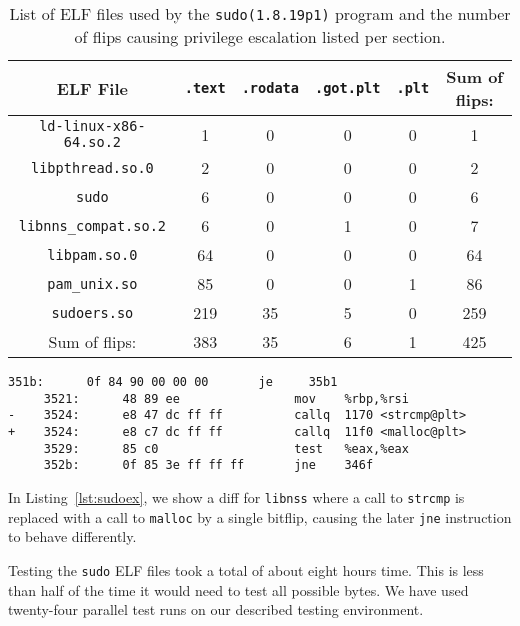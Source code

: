 \begin{table}[!htb]
\centering
\begin{tabular}{c|cccc|c}
ELF File & \texttt{.text}  & \texttt{.rodata} & \texttt{.got.plt} &
\texttt{.plt} & Sum of flips:                             \\ \hline
\texttt{ld-linux-x86-64.so.2} & 1   & 0  & 0  & 0  & 1    \\
\texttt{libpthread.so.0}      & 2   & 0  & 0  & 0  & 2    \\
\texttt{sudo}                 & 6   & 0  & 0  & 0  & 6    \\
\texttt{libnns\_compat.so.2}  & 6   & 0  & 1  & 0  & 7    \\
\texttt{libpam.so.0}          & 64  & 0  & 0  & 0  & 64   \\
\texttt{pam\_unix.so}         & 85  & 0  & 0  & 1  & 86   \\
\texttt{sudoers.so}           & 219 & 35 & 5  & 0  & 259  \\ \hline
Sum of flips:                 & 383 & 35 & 6  & 1  & 425
\end{tabular}
\caption{List of ELF files used by the \texttt{sudo(1.8.19p1)} program and the
number of flips causing privilege escalation listed per section.}
\label{tab:sudores}
\end{table}

\begin{minipage}{\linewidth}
\begin{lstlisting}[style=diff,
                   caption={Diff for a bitflip applied to \texttt{libnss} in
order to bypass a user privilege check. The call to \texttt{strcmp} is
replaced because of the offset in the lookuptable being one off.},
label=lst:sudoex]
     351b:      0f 84 90 00 00 00       je     35b1
     3521:      48 89 ee                mov    %rbp,%rsi
-    3524:      e8 47 dc ff ff          callq  1170 <strcmp@plt>
+    3524:      e8 c7 dc ff ff          callq  11f0 <malloc@plt>
     3529:      85 c0                   test   %eax,%eax
     352b:      0f 85 3e ff ff ff       jne    346f
\end{lstlisting}
\end{minipage}

In Listing~\ref{lst:sudoex}, we show a diff for \texttt{libnss} where a call to
\texttt{strcmp} is replaced with a call to \texttt{malloc} by a single bitflip,
causing the later \texttt{jne} instruction to behave differently.

Testing the \texttt{sudo} ELF files took a total of about eight hours time.
This is less than half of the time it would need to test all possible bytes. We
have used twenty-four parallel test runs on our described testing environment.

